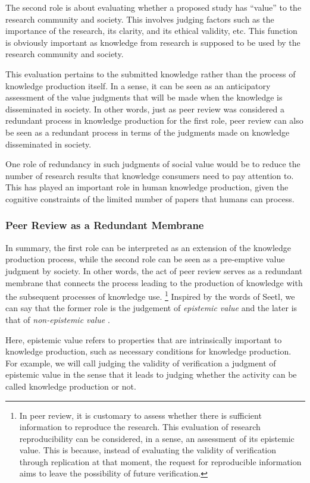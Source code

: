 The second role is about evaluating whether a proposed study has ``value'' to the research community and society. This involves judging factors such as the importance of the research, its clarity, and its ethical validity, etc. This function is obviously important as knowledge from research is supposed to be used by the research community and society.

This evaluation pertains to the submitted knowledge rather than the process of knowledge production itself. In a sense, it can be seen as an anticipatory assessment of the value judgments that will be made when the knowledge is disseminated in society. In other words, just as peer review was considered a redundant process in knowledge production for the first role, peer review can also be seen as a redundant process in terms of the judgments made on knowledge disseminated in society.

One role of redundancy in such judgments of social value would be to reduce the number of research results that knowledge consumers need to pay attention to. This has played an important role in human knowledge production, given the cognitive constraints of the limited number of papers that humans can process.

\subsubsection{Peer Review as a Redundant Membrane}

In summary, the first role can be interpreted as an extension of the knowledge production process, while the second role can be seen as a pre-emptive value judgment by society. In other words, the act of peer review serves as a redundant membrane that connects the process leading to the production of knowledge with the subsequent processes of knowledge use. \footnote{
In peer review, it is customary to assess whether there is sufficient information to reproduce the research. This evaluation of research reproducibility can be considered, in a sense, an assessment of its epistemic value. This is because, instead of evaluating the validity of verification through replication at that moment, the request for reproducible information aims to leave the possibility of future verification.
} Inspired by the words of Seetl, we can say that the former role is the judgement of \textit{epistemic value} and the later is that of \textit{non-epistemic value} \cite{steel2010epistemic}. 

Here, epistemic value refers to properties that are intrinsically important to knowledge production, such as necessary conditions for knowledge production. For example, we will call judging the validity of verification a judgment of epistemic value in the sense that it leads to judging whether the activity can be called knowledge production or not. 

